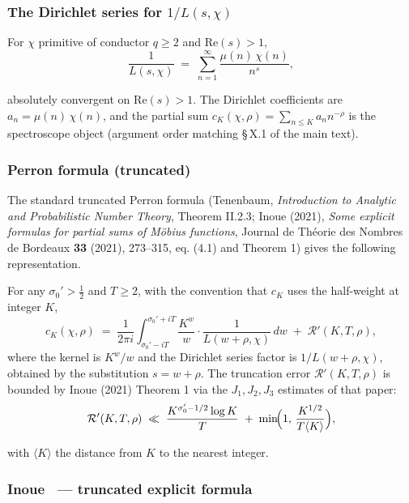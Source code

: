 \subsubsection{The Dirichlet series for \(1/L(s, \chi)\)}

For \(\chi\) primitive of conductor \(q \ge 2\) and \(\mathrm{Re}(s) > 1\),
\[
\frac{1}{L(s, \chi)}
\;=\;
\sum_{n=1}^{\infty} \frac{\mu(n)\,\chi(n)}{n^s},
\]

absolutely convergent on \(\mathrm{Re}(s) > 1\). The Dirichlet
coefficients are \(a_n = \mu(n)\,\chi(n)\), and the partial sum
\(c_K(\chi, \rho) = \sum_{n \le K} a_n n^{-\rho}\) is the spectroscope
object (argument order matching \S\,X.1 of the main text).

\subsubsection{Perron formula (truncated)}

The standard truncated Perron formula (Tenenbaum, \emph{Introduction to
Analytic and Probabilistic Number Theory}, Theorem II.2.3; Inoue
(2021), \emph{Some explicit formulas for partial sums of Möbius
functions}, Journal de Théorie des Nombres de Bordeaux \textbf{33} (2021),
273--315, eq. (4.1) and Theorem 1) gives the following representation.

For any \(\sigma_0' > \tfrac12\) and \(T \ge 2\), with the convention that
\(c_K\) uses the half-weight at integer \(K\),
\begin{equation}
\label{eq:Perron-truncated}
c_K(\chi, \rho)
\;=\;
\frac{1}{2\pi i} \int_{\sigma_0' - iT}^{\sigma_0' + iT}
\frac{K^w}{w} \cdot \frac{1}{L(w + \rho, \chi)} \,dw
\;+\; \mathcal{R}'(K, T, \rho),
\end{equation}
where the kernel is \(K^w / w\) and the Dirichlet series factor is
\(1/L(w + \rho, \chi)\), obtained by the substitution \(s = w + \rho\).
The truncation error \(\mathcal{R}'(K, T, \rho)\) is bounded by Inoue
(2021) Theorem 1 via the \(J_1, J_2, J_3\) estimates of that paper:
\[
\mathcal{R}'(K, T, \rho)
\;\ll\;
\frac{K^{\sigma_0' - 1/2}\log K}{T}
\;+\;
\min\!\Bigl(1,\, \frac{K^{1/2}}{T\langle K\rangle}\Bigr),
\]

with \(\langle K \rangle\) the distance from \(K\) to the nearest integer.

\subsubsection{Inoue~\cite[Theorem~1]{Inoue2021} --- truncated explicit formula}

